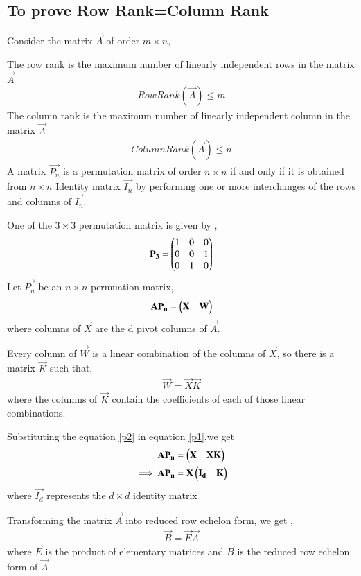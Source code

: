 \documentclass[journal,12pt,twocolumn]{IEEEtran}
\begin{document}
\subsection{To prove Row Rank=Column Rank}
Consider the matrix $\vec{A}$ of order $m\times n$,  

The row rank is the maximum number of linearly independent rows in the matrix $\vec{A}$
\begin{align}
    RowRank(\vec{A}) \leq m \label{rr}
\end{align}
The column rank is the maximum number of linearly independent column in the matrix $\vec{A}$
\begin{align}
    ColumnRank(\vec{A}) \leq n \label{cr}
\end{align}
A matrix $\vec{P_n}$ is a permutation matrix of order $n \times n$ if and only if it is obtained from $n \times n$ Identity matrix $\vec{I_n}$ by performing one or more interchanges of the rows and columns of $\vec{I_n}$.

One of the $3 \times 3$ permutation matrix is given by , 
\begin{align}
    \mathbf{P_3}=\begin{pmatrix}1 & 0 & 0 \\0 & 0 & 1\\ 0 & 1 & 0\end{pmatrix}
\end{align}
Let $\vec{P_n}$ be an $n \times n$ permuation matrix,
\begin{align}
    \mathbf{A}\mathbf{P_n}=\begin{pmatrix}\mathbf{X}&\mathbf{W}\end{pmatrix}\label{p1}
\end{align}
where  columns of $\vec{X}$ are the d pivot columns of $\vec{A}$.

Every column of $\vec{W}$ is a linear combination of the columns of $\vec{X}$, so there is a matrix $\vec{K}$ such that,
\begin{align}
    \vec{W}=\vec{X}\vec{K}\label{p2}
\end{align}
where the columns of $\vec{K}$ contain the coefficients of each of those linear combinations.

Substituting the equation \eqref{p2} in equation \eqref{p1},we get 
\begin{align}
    \mathbf{A}\mathbf{P_n}&=\begin{pmatrix}\mathbf{X} &\mathbf{X}\mathbf{K}\end{pmatrix}\\
    \implies \mathbf{A}\mathbf{P_n}&=\mathbf{X}\begin{pmatrix}\mathbf{I_d}&\mathbf{K}\end{pmatrix}\label{p3}
\end{align}
where $\vec{I_d}$ represents the $d \times d$ identity matrix

Transforming the matrix $\vec{A}$ into reduced row echelon form, we get ,
\begin{align}
    \vec{B}=\vec{E}\vec{A}
\end{align}
where $\vec{E}$ is the product of elementary matrices and $\vec{B}$ is the reduced row echelon form of $\vec{A}$
\end{document}

